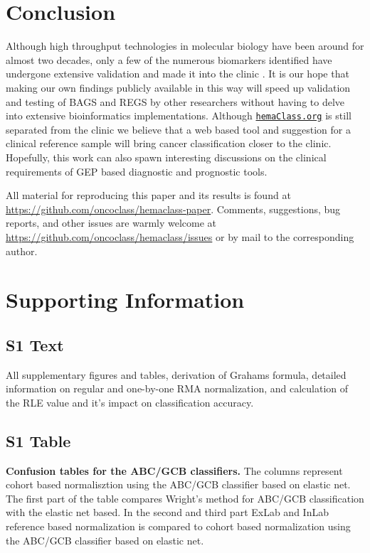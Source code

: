 \documentclass[10pt,letterpaper]{article}
\newcommand{\hemaClass}{\href{http://hemaClass.org}{\texttt{hemaClass.org}}}
\begin{document}
\section*{Conclusion}
Although high throughput technologies in molecular biology have been around for almost two decades, only a few of the numerous biomarkers identified have undergone extensive validation and made it into the clinic \cite{Chen2012a}.
It is our hope that making our own findings publicly available in this way will speed up validation and testing of BAGS and REGS by other researchers without having to delve into extensive bioinformatics implementations.
Although \hemaClass{} is still separated from the clinic we believe that a web based tool and suggestion for a clinical reference sample will bring cancer classification closer to the clinic.
Hopefully, this work can also spawn interesting discussions on the clinical requirements of GEP based diagnostic and prognostic tools.

All material for reproducing this paper and its results is found at \url{https://github.com/oncoclass/hemaclass-paper}.
Comments, suggestions, bug reports, and other issues are warmly welcome at \url{https://github.com/oncoclass/hemaclass/issues} or by mail to the corresponding author.

\section*{Supporting Information}

\setcounter{equation}{0}
\setcounter{figure}{0}
\setcounter{table}{0}

\renewcommand{\theequation}{S\arabic{equation}}
\renewcommand{\thefigure}{S\arabic{figure}}
\renewcommand{\thetable}{S\arabic{table}}
\renewcommand{\thesection}{S\arabic{section}}

\subsection*{S1 Text}\label{supp:text}
All supplementary figures and tables, derivation of Grahams formula, detailed information on regular and one-by-one RMA normalization, and calculation of the RLE value and it's impact on classification accuracy. 

\subsection*{S1 Table}\label{tab:confusionABCGCBHEMA}
\textbf{Confusion tables for the ABC/GCB classifiers.}
The columns represent cohort based normalisztion using the ABC/GCB classifier
based on elastic net.
The first part of the table compares Wright's method for ABC/GCB classification
with the elastic net based.
In the second and third part ExLab and InLab reference based normalization is
compared to cohort based normalization using the ABC/GCB classifier based on
elastic net.
\end{document}

